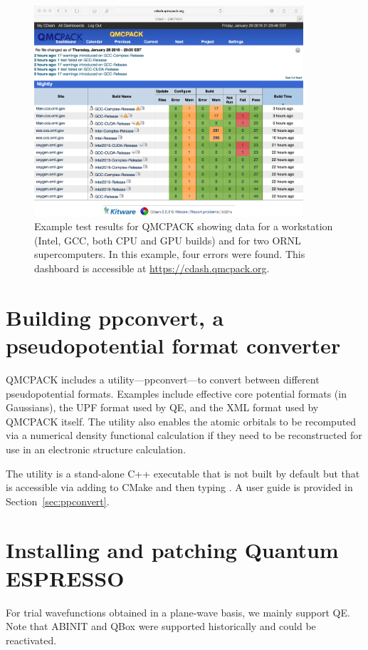 \begin{figure}
  \centering
  \includegraphics[width=10cm]{./figures/QMCPACK_CDash_CTest_Results_20160129.png}
  \caption{Example test results for QMCPACK showing data for a
    workstation (Intel, GCC, both CPU and GPU builds) and for two ORNL
    supercomputers. In this example, four errors were found. This
    dashboard is accessible at \url{https://cdash.qmcpack.org}.}
\end{figure}

\section{Building ppconvert, a pseudopotential format converter}
\label{sec:buildppconvert}
QMCPACK includes a utility---ppconvert---to convert between different
pseudopotential formats. Examples include effective core potential
formats (in Gaussians), the UPF format used by QE, and
the XML format used by QMCPACK itself. The utility also enables the
atomic orbitals to be recomputed via a numerical density functional
calculation if they need to be reconstructed for use in an
electronic structure calculation.

The utility is a stand-alone C++ executable that is not built by default but that is accessible via adding
 to CMake and then typing .
A user guide is provided in Section~\ref{sec:ppconvert}.

\section{Installing and patching Quantum ESPRESSO}
\label{sec:buildqe}
For trial wavefunctions obtained in a plane-wave basis, we mainly
support QE. Note that ABINIT and QBox were supported historically
and could be reactivated.

